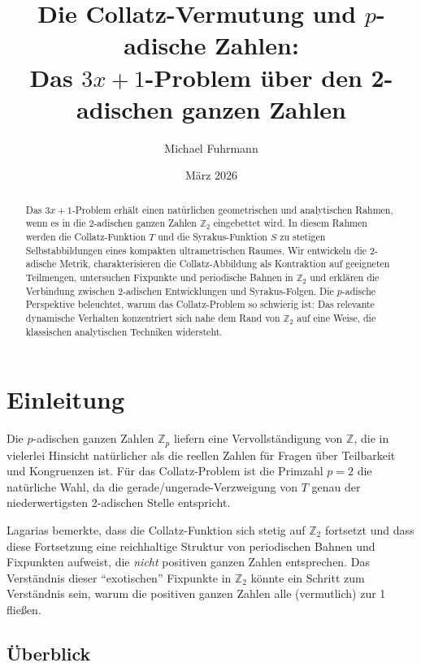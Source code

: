 \documentclass[12pt,a4paper]{article}
\begin{document}
\title{Die Collatz-Vermutung und $p$-adische Zahlen:\\
Das $3x+1$-Problem über den 2-adischen ganzen Zahlen}
\author{Michael Fuhrmann}
\date{März 2026}
\maketitle

\begin{abstract}
Das $3x+1$-Problem erhält einen natürlichen geometrischen und analytischen Rahmen,
wenn es in die 2-adischen ganzen Zahlen $\mathbb{Z}_2$ eingebettet wird. In diesem
Rahmen werden die Collatz-Funktion $T$ und die Syrakus-Funktion $S$ zu stetigen
Selbstabbildungen eines kompakten ultrametrischen Raumes. Wir entwickeln die 2-adische
Metrik, charakterisieren die Collatz-Abbildung als Kontraktion auf geeigneten
Teilmengen, untersuchen Fixpunkte und periodische Bahnen in $\mathbb{Z}_2$ und
erklären die Verbindung zwischen 2-adischen Entwicklungen und Syrakus-Folgen.
Die $p$-adische Perspektive beleuchtet, warum das Collatz-Problem so schwierig ist:
Das relevante dynamische Verhalten konzentriert sich nahe dem Rand von $\mathbb{Z}_2$
auf eine Weise, die klassischen analytischen Techniken widersteht.
\end{abstract}

\tableofcontents

\newpage

\section{Einleitung}

Die $p$-adischen ganzen Zahlen $\mathbb{Z}_p$ liefern eine Vervollständigung von
$\mathbb{Z}$, die in vielerlei Hinsicht natürlicher als die reellen Zahlen für Fragen
über Teilbarkeit und Kongruenzen ist. Für das Collatz-Problem ist die Primzahl $p = 2$
die natürliche Wahl, da die gerade/ungerade-Verzweigung von $T$ genau der niederwertigsten
2-adischen Stelle entspricht.

Lagarias \cite{Lagarias1985} bemerkte, dass die Collatz-Funktion sich stetig auf
$\mathbb{Z}_2$ fortsetzt und dass diese Fortsetzung eine reichhaltige Struktur von
periodischen Bahnen und Fixpunkten aufweist, die \emph{nicht} positiven ganzen Zahlen
entsprechen. Das Verständnis dieser ``exotischen'' Fixpunkte in $\mathbb{Z}_2$ könnte
ein Schritt zum Verständnis sein, warum die positiven ganzen Zahlen alle (vermutlich)
zur 1 fließen.

\subsection{Überblick}
\end{document}
